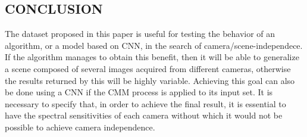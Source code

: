 \subsection{CONCLUSION}
The dataset proposed in this paper is useful for testing the behavior of 
an algorithm, or a model based on CNN, in the search of camera/scene-independece. 
If the algorithm manages to obtain this benefit, then it will be 
able to generalize a scene composed of several images acquired from different 
cameras, otherwise the results returned by this will be highly variable. 
Achieving this goal can also be done using a CNN if the CMM process is 
applied to its input set. It is necessary to specify that, in order to 
achieve the final result, it is essential to have the spectral sensitivities of each camera 
without which it would not be possible to achieve camera independence.